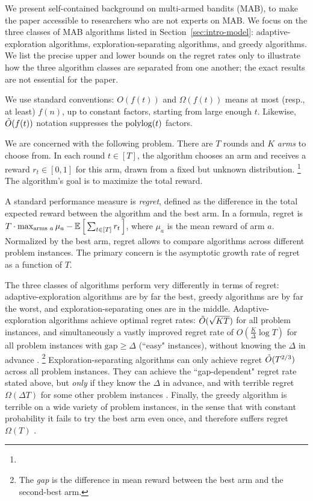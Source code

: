 We present self-contained background on multi-armed bandits (MAB), to make the paper accessible to researchers who are not experts on MAB.
We focus on the three classes of MAB algorithms listed in Section~\ref{sec:intro-model}: adaptive-exploration algorithms, exploration-separating algorithms, and greedy algorithms. We list the precise upper and lower bounds on the regret rates only to illustrate how the three algorithm classes are separated from one another; the exact results are not essential for the paper.

We use standard conventions: $O(f(t))$ and $\Omega(f(t))$ means at most (resp., at least) $f(n)$, up to constant factors, starting from large enough $t$. Likewise, $\tilde{O}(f(t))$ notation suppresses the $\polylog(t)$ factors.

We are concerned with the following problem. There are $T$ rounds and $K$ \emph{arms} to choose from. In each round $t\in [T]$, the algorithm chooses an arm and receives a reward $r_t\in[0,1]$ for this arm, drawn from a fixed but unknown distribution.%
\footnote{}
The algorithm's goal is to maximize the total reward.

A standard performance measure is \emph{regret}, defined as the difference in the total expected reward between the algorithm and the best arm. In a formula, regret is
    $T\cdot \max_{\text{arms $a$}}\mu_a
    -  \E\sbr{ \sum_{t\in[T]} r_t }$,
where $\mu_a$ is the mean reward of arm $a$.
Normalized by the best arm, regret allows to compare algorithms across different problem instances.
The primary concern is the asymptotic growth rate of regret as a function of $T$.

The three classes of algorithms perform very differently in terms of regret: adaptive-exploration algorithms are by far the best, greedy algorithms are by far the worst, and exploration-separating ones are in the middle. Adaptive-exploration algorithms achieve optimal regret rates:
    $\tilde{O}(\sqrt{KT})$
for all problem instances, and simultaneously a vastly improved regret rate of
    $O(\tfrac{K}{\Delta}\log T)$
for all problem instances with $\text{gap}\geq \Delta$ (``easy" instances), without knowing the $\Delta$ in advance
\citep{Lai-Robbins-85,bandits-ucb1,bandits-exp3}.%
\footnote{The \emph{gap} is the difference in mean reward between the best arm and the second-best arm.}
Exploration-separating algorithms can only achieve regret $\tilde{O}(T^{2/3})$ across all problem instances. They can achieve the ``gap-dependent" regret rate stated above, but \emph{only} if they know the $\Delta$ in advance, and with terrible regret $\Omega(\Delta T)$ for some other problem instances \citep{MechMAB-ec09}. Finally, the greedy algorithm is terrible on a wide variety of problem instances, in the sense that with constant probability it fails to try the best arm even once, and therefore suffers regret $\Omega(T)$
\citep[see Chapter 11.2 in][]{slivkins-MABbook}.


